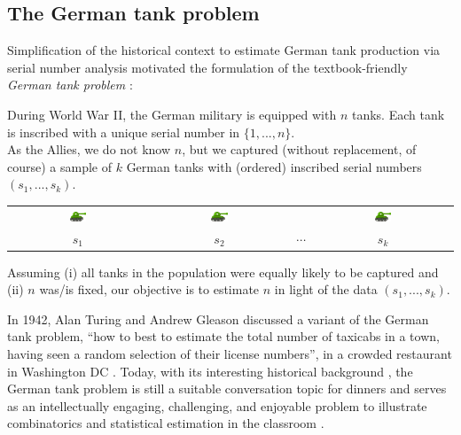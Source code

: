 \documentclass[11pt, oneside]{article}
\newcommand{\data}{$(s_1, ..., s_k)$\xspace}
\begin{document}
\subsection{The German tank problem}
Simplification of the historical context to estimate German tank production via serial number analysis \cite{ruggles1947empirical} motivated the formulation of the textbook-friendly \emph{German tank problem} \cite{goodman1952serial}: 
\begin{tcolorbox}[title=Problem statement, colback=white, colframe=c1]
\noindent 
During World War II, the German military is equipped with $n$ tanks. 
Each tank is inscribed with a unique serial number in $\{1, ..., n\}$. \\

As the Allies, we do not know $n$, but we captured (without replacement, of course) a sample of $k$ German tanks with (ordered) inscribed serial numbers \data. 

\begin{center}
	\begin{tabular}{cccc}
		\includegraphics[width=0.125\textwidth]{tank.png} &  \includegraphics[width=0.125\textwidth]{tank.png}  & & \includegraphics[width=0.125\textwidth]{tank.png} \\
		\large $s_1$ & \large $s_2$ & \large $\cdots$ & \large $s_k$ 
	\end{tabular}
\end{center}

Assuming (i) all tanks in the population were equally likely to be captured and (ii) $n$ was/is fixed, our objective is to estimate $n$ in light of the data \data.
\end{tcolorbox}

In 1942, Alan Turing and Andrew Gleason discussed a variant of the German tank problem, ``how to best to estimate the total number of taxicabs in a town, having seen a random selection of their license numbers'', in a crowded restaurant in Washington DC \cite{hodges2014alan,hall2014alan}. 
Today, with its interesting historical background \cite{ruggles1947empirical}, 
the German tank problem is still a suitable conversation topic for dinners and serves as an intellectually engaging, challenging, and enjoyable problem to illustrate combinatorics and statistical estimation in the classroom \cite{johnson1994estimating,berg2021bayesian,mosteller1987fifty,downey2021think}.
\end{document}

